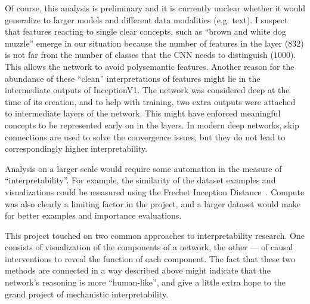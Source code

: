 \documentclass[12pt]{article}
\begin{document}
Of course, this analysis is preliminary and it is currently unclear whether it would generalize to larger models and different data modalities (e.g. text). I suspect that features reacting to single clear concepts, such as ``brown and white dog muzzle'' emerge in our situation because the number of features in the layer ($832$) is not far from the number of classes that the CNN needs to distinguish ($1000$). This allows the network to avoid polysemantic features. Another reason for the abundance of these ``clean'' interpretations of features might lie in the intermediate outputs of InceptionV1. The network was considered deep at the time of its creation, and to help with training, two extra outputs were attached to intermediate layers of the network. This might have enforced meaningful concepts to be represented early on in the layers. In modern deep networks, skip connections are used to solve the convergence issues, but they do not lead to correspondingly higher interpretability.

Analysis on a larger scale would require some automation in the measure of ``interpretability''. For example, the similarity of the dataset examples and visualizations could be measured using the Frechet Inception Distance~\cite{heusel2017gans}. Compute was also clearly a limiting factor in the project, and a larger dataset would make for better examples and importance evaluations.

This project touched on two common approaches to interpretability research. One consists of visualization of the components of a network, the other --- of causal interventions to reveal the function of each component. The fact that these two methods are connected in a way described above might indicate that the network's reasoning is more ``human-like'', and give a little extra hope to the grand project of mechanistic interpretability.

\begingroup
\raggedright
\sloppy


\endgroup


\clearpage
\end{document}
